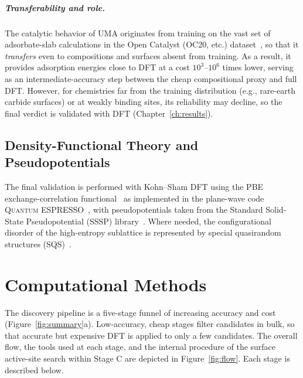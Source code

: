 \documentclass[11pt,a4paper]{report}
\begin{document}
\paragraph{Transferability and role.} The catalytic behavior of UMA originates from training on the vast set of adsorbate-slab calculations in the Open Catalyst (OC20, etc.) dataset~\cite{chanussot2021},
so that it \emph{transfers} even to compositions and surfaces absent from training. As a result, it provides adsorption energies close to DFT at a cost $10^3$--$10^6$ times lower,
serving as an intermediate-accuracy step between the cheap compositional proxy and full
DFT. However, for chemistries far from the training distribution (e.g., rare-earth carbide surfaces) or at
weakly binding sites, its reliability may decline, so the final verdict is validated with DFT (Chapter~\ref{ch:results}).

\section{Density-Functional Theory and Pseudopotentials}
The final validation is performed with Kohn--Sham DFT using the PBE exchange-correlation
functional~\cite{pbe1996} as implemented in the plane-wave code \textsc{Quantum ESPRESSO}~\cite{giannozzi2009}, with pseudopotentials taken from the Standard Solid-State
Pseudopotential (SSSP) library~\cite{prandini2018}. Where needed, the configurational
disorder of the high-entropy sublattice is represented by special quasirandom structures (SQS)~\cite{zunger1990}.

\chapter{Computational Methods}
\label{ch:methods}

\noindent The discovery pipeline is a five-stage funnel of increasing accuracy and cost (Figure~\ref{fig:summary}a).
Low-accuracy, cheap stages filter candidates in bulk, so that accurate but expensive DFT is applied to only a few candidates.
The overall flow, the tools used at each stage, and the internal procedure of the surface active-site search within Stage C are depicted in Figure~\ref{fig:flow}.
Each stage is described below.
\end{document}
